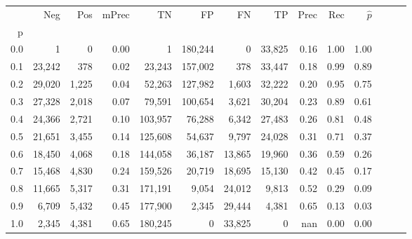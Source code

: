 \begin{tabular}{rrrrrrrrrrrrrr}
\toprule
{} &     Neg &    Pos & mPrec &       TN &       FP &      FN &      TP &  Prec &   Rec & $\hat{p}$ \\
p   &         &        &       &          &          &         &         &       &       &           \\
\midrule
0.0 &       1 &      0 &  0.00 &        1 &  180,244 &       0 &  33,825 &  0.16 &  1.00 &      1.00 \\
0.1 &  23,242 &    378 &  0.02 &   23,243 &  157,002 &     378 &  33,447 &  0.18 &  0.99 &      0.89 \\
0.2 &  29,020 &  1,225 &  0.04 &   52,263 &  127,982 &   1,603 &  32,222 &  0.20 &  0.95 &      0.75 \\
0.3 &  27,328 &  2,018 &  0.07 &   79,591 &  100,654 &   3,621 &  30,204 &  0.23 &  0.89 &      0.61 \\
0.4 &  24,366 &  2,721 &  0.10 &  103,957 &   76,288 &   6,342 &  27,483 &  0.26 &  0.81 &      0.48 \\
0.5 &  21,651 &  3,455 &  0.14 &  125,608 &   54,637 &   9,797 &  24,028 &  0.31 &  0.71 &      0.37 \\
0.6 &  18,450 &  4,068 &  0.18 &  144,058 &   36,187 &  13,865 &  19,960 &  0.36 &  0.59 &      0.26 \\
0.7 &  15,468 &  4,830 &  0.24 &  159,526 &   20,719 &  18,695 &  15,130 &  0.42 &  0.45 &      0.17 \\
0.8 &  11,665 &  5,317 &  0.31 &  171,191 &    9,054 &  24,012 &   9,813 &  0.52 &  0.29 &      0.09 \\
0.9 &   6,709 &  5,432 &  0.45 &  177,900 &    2,345 &  29,444 &   4,381 &  0.65 &  0.13 &      0.03 \\
1.0 &   2,345 &  4,381 &  0.65 &  180,245 &        0 &  33,825 &       0 &   nan &  0.00 &      0.00 \\
\bottomrule
\end{tabular}
